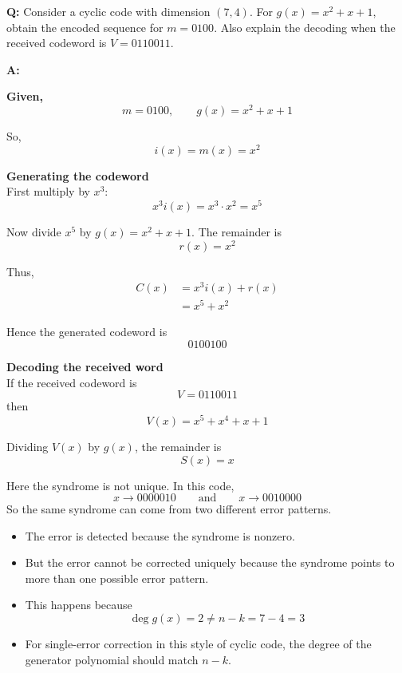 \documentclass[11pt,a4paper]{book}
\newenvironment{infobox}[1][Information]{%
    \begin{tcolorbox}[
        enhanced,
        breakable,
        colback=mintgreen!10,
        colframe=mintgreen!200,
        title=#1,
        fonttitle=\bfseries,
        sharp corners,
        boxrule=0.8pt,
        left=8pt,
        right=8pt,
        top=6pt,
        bottom=6pt
    ]
}{\end{tcolorbox}}
\newcounter{qna}[chapter]
\renewcommand{\theqna}{\thechapter.\arabic{qna}}
\newenvironment{questionanswerbox}[1][Example]{%
    \refstepcounter{qna}
    \begin{tcolorbox}[
        enhanced,
        breakable,
        colback=softlavender!10,
        colframe=softlavender!200,
        title={#1~\theqna},
        fonttitle=\bfseries,
        coltitle=white,
        colbacktitle=softlavender!200,
        sharp corners,
        boxrule=1pt,
        left=8pt,
        right=8pt,
        top=6pt,
        bottom=6pt
    ]
}{\end{tcolorbox}}
\begin{document}
\begin{questionanswerbox}[Cyclic Encoding with Detection-Only Case Example]
\textbf{Q:} Consider a cyclic code with dimension \((7,4)\). For \(g(x)=x^2+x+1\), obtain the encoded sequence for \(m=0100\). Also explain the decoding when the received codeword is \(V=0110011\).

\textbf{A:}

\textbf{Given,}
\[
m=0100,\qquad g(x)=x^2+x+1
\]

So,
\[
i(x)=m(x)=x^2
\]

\textbf{Generating the codeword}\\
First multiply by \(x^3\):
\[
x^3 i(x)=x^3 \cdot x^2=x^5
\]

Now divide \(x^5\) by \(g(x)=x^2+x+1\). The remainder is
\[
r(x)=x^2
\]

Thus,
\begin{align*}
C(x)&=x^3i(x)+r(x)\\
    &=x^5+x^2
\end{align*}

Hence the generated codeword is
\[
0100100
\]

\textbf{Decoding the received word}\\
If the received codeword is
\[
V=0110011
\]
then
\[
V(x)=x^5+x^4+x+1
\]

Dividing \(V(x)\) by \(g(x)\), the remainder is
\[
S(x)=x
\]

Here the syndrome is not unique. In this code,
\[
x \longrightarrow 0000010
\qquad \text{and} \qquad
x \longrightarrow 0010000
\]
So the same syndrome can come from two different error patterns.

\begin{infobox}[What This Means]
\begin{itemize}
    \item The error is detected because the syndrome is nonzero.
    \item But the error cannot be corrected uniquely because the syndrome points to more than one possible error pattern.
    \item This happens because
    \[
    \deg g(x)=2 \neq n-k=7-4=3
    \]
    \item For single-error correction in this style of cyclic code, the degree of the generator polynomial should match \(n-k\).
\end{itemize}
\end{infobox}
\end{questionanswerbox}
\end{document}
